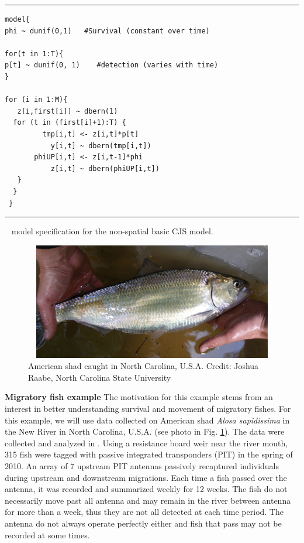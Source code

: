 \begin{panel}[htp]
\centering
\rule[0.1in]{\textwidth}{.03in}
{\small
\begin{verbatim}
model{
phi ~ dunif(0,1)   #Survival (constant over time)

for(t in 1:T){
p[t] ~ dunif(0, 1)    #detection (varies with time)
}

for (i in 1:M){
   z[i,first[i]] ~ dbern(1)
  for (t in (first[i]+1):T) {
         tmp[i,t] <- z[i,t]*p[t]
           y[i,t] ~ dbern(tmp[i,t])
       phiUP[i,t] <- z[i,t-1]*phi
           z[i,t] ~ dbern(phiUP[i,t])
   }
  }
 }
\end{verbatim}
}

\rule[-0.1in]{\textwidth}{.03in}
\caption{
\jags~ model specification for the non-spatial basic CJS model.}
\label{open.panel.nsCJS}
\end{panel}


\begin{figure}
\centering
\includegraphics[height=2in,width=4.43in]{Ch16-Open/figs/American_Shad_Raabe.jpg}
\caption{American shad caught in North Carolina, U.S.A.  Credit: Joshua Raabe, North Carolina State University}
\label{open.figs.shadpic}
\end{figure}

{\bf Migratory fish example}
The motivation for this example stems from an interest in better
understanding survival and movement of migratory fishes.  For this
example, we will use data collected on American shad \textit{Alosa sapidissima}
in the New River in North Carolina, U.S.A. (see photo in Fig. \ref{open.figs.shadpic}).
The data were collected and analyzed in \cite{raabe_diss:2012}.
Using a resistance board weir near the
river mouth, 315 fish
were tagged with passive integrated transponders (PIT) in the spring
of 2010. An array of 7 upstream PIT antennas passively recaptured
individuals during upstream and downstream migrations.  Each time a fish passed
over the antenna, it was recorded and summarized weekly for 12 weeks. The
fish do not necessarily move past all antenna and may remain in the river between 
antenna for more than a week, thus they are not all detected at each time period.
The antenna do not always operate perfectly either and fish that pass may not be recorded
at some times.

